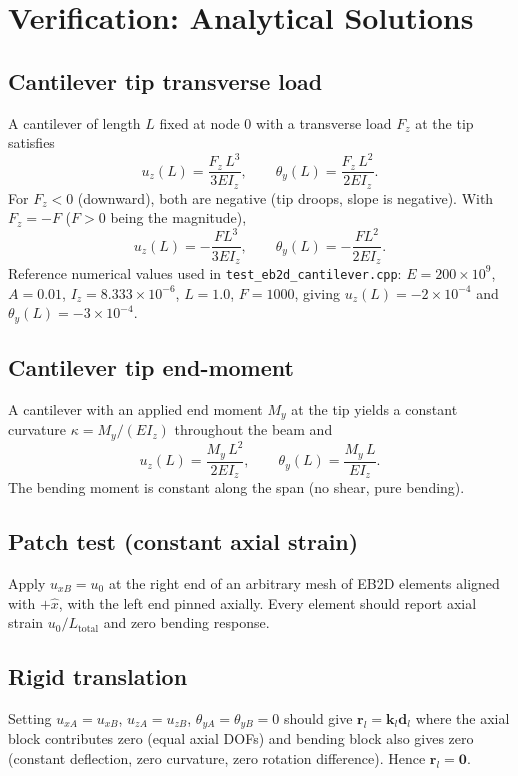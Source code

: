 \documentclass[11pt,a4paper]{article}
\newcommand{\bmath}[1]{\boldsymbol{#1}}
\begin{document}
\section{Verification: Analytical Solutions}\label{sec:verification}

\subsection{Cantilever tip transverse load}

A cantilever of length $L$ fixed at node 0 with a transverse load $F_z$ at the tip satisfies
\[
u_z(L) = \frac{F_z\,L^3}{3 E I_z}, \qquad \theta_y(L) = \frac{F_z\,L^2}{2 E I_z}.
\]
For $F_z < 0$ (downward), both are negative (tip droops, slope is negative). With $F_z = -F$ ($F > 0$ being the magnitude),
\[
u_z(L) = -\frac{F L^3}{3 E I_z}, \qquad \theta_y(L) = -\frac{F L^2}{2 E I_z}.
\]
Reference numerical values used in \texttt{test\_eb2d\_cantilever.cpp}: $E = 200\!\times\!10^9$, $A = 0.01$, $I_z = 8.333\!\times\!10^{-6}$, $L=1.0$, $F=1000$, giving $u_z(L) = -2\!\times\!10^{-4}$ and $\theta_y(L) = -3\!\times\!10^{-4}$.

\subsection{Cantilever tip end-moment}

A cantilever with an applied end moment $M_y$ at the tip yields a constant curvature $\kappa = M_y / (E I_z)$ throughout the beam and
\[
u_z(L) = \frac{M_y\,L^2}{2 E I_z}, \qquad \theta_y(L) = \frac{M_y\,L}{E I_z}.
\]
The bending moment is constant along the span (no shear, pure bending).

\subsection{Patch test (constant axial strain)}

Apply $u_{xB} = u_0$ at the right end of an arbitrary mesh of EB2D elements aligned with $+\hat{x}$, with the left end pinned axially. Every element should report axial strain $u_0 / L_{\text{total}}$ and zero bending response.

\subsection{Rigid translation}

Setting $u_{xA} = u_{xB}$, $u_{zA} = u_{zB}$, $\theta_{yA} = \theta_{yB} = 0$ should give $\bmath{r}_l = \bmath{k}_l \bmath{d}_l$ where the axial block contributes zero (equal axial DOFs) and bending block also gives zero (constant deflection, zero curvature, zero rotation difference). Hence $\bmath{r}_l = \bmath{0}$.
\end{document}
